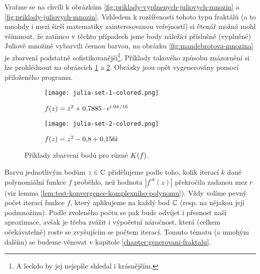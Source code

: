 Vraťme se na chvíli k obrázkům \ref{fig:priklady-vyplnenych-juliovych-mnozin} a \ref{fig:priklady-juliovych-mnozin}. Vzhledem k rozšířenosti tohoto typu fraktálů (a to mnohdy i mezi širší matematiky zainteresovanou veřejností) si čtenář možná mohl všimnout, že zatímco v těchto případech jsme body náležící příslušné (vyplněné) Juliově množině vybarvili černou barvou, na obrázku \ref{fig:mandebrotova-mnozina} je zbarvení podstatně sofistikovanější\footnote{A leckdo by jej nejspíše shledal i krásnějším.}. Příklady takového způsobu znázornění si lze prohlédnout na obrázcích \ref{subfig:vyplnena-juliova-mnozina-1-obarveno} a \ref{subfig:vyplnena-juliova-mnozina-2-obarveno}. Obrázky jsou opět vygenerovány pomocí přiloženého programu.
\begin{figure}[h]
    \centering
    \begin{subfigure}{0.48\textwidth}
        \centering
        \texttt{[image: julia-set-1-colored.png]}
        \caption{$f(z)=z^2 + 0{,}7885\cdot e^{\textrm{i}\cdot9\pi/16}$}
        \label{subfig:vyplnena-juliova-mnozina-1-obarveno}
    \end{subfigure}
    \quad
    \begin{subfigure}{0.48\textwidth}
        \centering
        \texttt{[image: julia-set-2-colored.png]}
        \caption{$f(z)=z^2 - 0{,}8 + 0{,}156\textrm{i}$}
        \label{subfig:vyplnena-juliova-mnozina-2-obarveno}
    \end{subfigure}
    \caption{Příklady zbarvení bodů pro různé $K(f)$.}
    \label{fig:priklady-vyplnenych-juliovych-mnozin-obarveno}
\end{figure}

Barvu jednotlivým bodům $z\in\mathbb{C}$ přidělujeme podle toho, kolik iterací $k$ dané polynomiální funkce $f$ proběhlo, než hodnota $|f^{\circ k}(z)|$ překročila zadanou mez $r$ (viz lemma \ref{lem:test-konvergence-komplexniho-polynomu}). Vždy volíme pevný počet iterací funkce $f$, který aplikujeme na každý bod $\mathbb{C}$ (resp. na nějakou její podmnožinu). Podle zvoleného počtu se pak bude odvíjet i přesnost naší aproximace, avšak je třeba zvážit i výpočetní náročnost, která (celkem očekávatelně) roste se zvyšujícím se počtem iterací. Tomuto tématu (a mnohým dalším) se budeme věnovat v kapitole \ref{chapter:generovani-fraktalu}.
 
